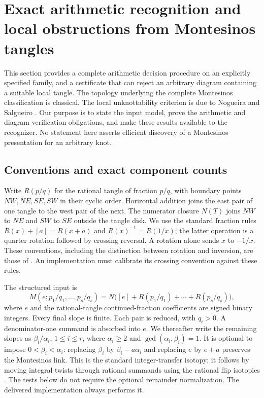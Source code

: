 
\section{Exact arithmetic recognition and local obstructions from Montesinos tangles}
\label{sec:mon:montesinos}

This section provides a complete arithmetic decision procedure on an explicitly
specified family, and a certificate that can reject an arbitrary diagram
containing a suitable local tangle.  The topology underlying the complete
Montesinos classification is classical.  The local unknottability criterion is
due to Nogueira and Salgueiro \cite[Theorem~4.9]{nogueira-salgueiro}.
Our purpose is to state the input model, prove the arithmetic and diagram
verification obligations, and make these results available to the recognizer.
No statement here asserts efficient discovery of a Montesinos presentation for
an arbitrary knot.

\subsection{Conventions and exact component counts}

Write $R(p/q)$ for the rational tangle of fraction $p/q$, with boundary points
$NW,NE,SE,SW$ in their cyclic order.  Horizontal addition joins the east pair
of one tangle to the west pair of the next.  The numerator closure $N(T)$ joins
$NW$ to $NE$ and $SW$ to $SE$ outside the tangle disk.  We use the standard
fraction rules $R(x)+[a]=R(x+a)$ and $R(x)^{-1}=R(1/x)$; the latter operation
is a quarter rotation followed by crossing reversal.  A rotation alone sends
$x$ to $-1/x$.  These conventions, including the distinction between rotation
and inversion, are those of \cite[Section~2]{kauffman-lambropoulou-tangles}.
An implementation must calibrate its crossing convention against these rules.

The structured input is
\[
 M(e;p_1/q_1,\ldots,p_s/q_s)
 =N\bigl([e]+R(p_1/q_1)+\cdots+R(p_s/q_s)\bigr),
\]
where $e$ and the rational-tangle continued-fraction coefficients are signed
binary integers.  Every final slope is finite.  Each pair is reduced, with
$q_i>0$.  A denominator-one summand is absorbed into $e$.  We thereafter write
the remaining slopes as $\beta_i/\alpha_i$, $1\le i\le r$, where
$\alpha_i\ge2$ and $\gcd(\alpha_i,\beta_i)=1$.
It is optional to impose $0<\beta_i<\alpha_i$: replacing
$\beta_i$ by $\beta_i-a\alpha_i$ and replacing $e$ by $e+a$ preserves the
Montesinos link.  This is the standard integer-transfer isotopy; it follows
by moving integral twists through rational summands using the rational flip
isotopies \cite[Section~2]{kauffman-lambropoulou-tangles}.
The tests below do not require the optional remainder normalization. The delivered implementation always performs it.

